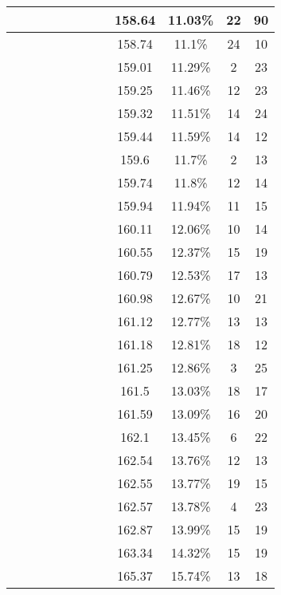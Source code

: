 \begin{center}
\begin{longtable}{|c|c|c|c|c|c|c|c|c|c|c|c|}
 \x &  \x &  &  \x &  \x &  &  &  \x & 158.64 & 11.03\% & 22 & 90 \\ \hline
 \x &  \x &  &  &  &  &  \x &  \x & 158.74 & 11.1\% & 24 & 10 \\ \hline
 \x &  \x &  &  &  \x &  \x &  \x &  & 159.01 & 11.29\% & 2 & 23 \\ \hline
 \x &  &  \x &  &  \x &  &  \x &  \x & 159.25 & 11.46\% & 12 & 23 \\ \hline
 \x &  \x &  \x &  \x &  \x &  &  \x &  & 159.32 & 11.51\% & 14 & 24 \\ \hline
 \x &  \x &  \x &  &  \x &  &  \x &  \x & 159.44 & 11.59\% & 14 & 12 \\ \hline
 \x &  &  \x &  &  &  \x &  \x &  \x & 159.6 & 11.7\% & 2 & 13 \\ \hline
 \x &  \x &  \x &  &  \x &  &  &  & 159.74 & 11.8\% & 12 & 14 \\ \hline
 \x &  &  &  \x &  &  &  \x &  \x & 159.94 & 11.94\% & 11 & 15 \\ \hline
 \x &  \x &  &  \x &  &  \x &  \x &  & 160.11 & 12.06\% & 10 & 14 \\ \hline
 \x &  \x &  \x &  \x &  \x &  &  &  & 160.55 & 12.37\% & 15 & 19 \\ \hline
 \x &  &  &  &  \x &  &  \x &  \x & 160.79 & 12.53\% & 17 & 13 \\ \hline
 \x &  &  &  &  &  &  \x &  & 160.98 & 12.67\% & 10 & 21 \\ \hline
 \x &  \x &  &  \x &  \x &  &  \x &  & 161.12 & 12.77\% & 13 & 13 \\ \hline
 \x &  &  &  &  &  &  \x &  \x & 161.18 & 12.81\% & 18 & 12 \\ \hline
 \x &  &  \x &  &  &  &  \x &  \x & 161.25 & 12.86\% & 3 & 25 \\ \hline
 \x &  &  \x &  \x &  \x &  &  &  \x & 161.5 & 13.03\% & 18 & 17 \\ \hline
 \x &  &  &  &  \x &  &  \x &  & 161.59 & 13.09\% & 16 & 20 \\ \hline
 \x &  \x &  &  \x &  &  &  \x &  \x & 162.1 & 13.45\% & 6 & 22 \\ \hline
 \x &  &  \x &  &  \x &  &  \x &  & 162.54 & 13.76\% & 12 & 13 \\ \hline
 \x &  \x &  &  \x &  \x &  &  &  & 162.55 & 13.77\% & 19 & 15 \\ \hline
 \x &  &  &  \x &  &  \x &  \x &  \x & 162.57 & 13.78\% & 4 & 23 \\ \hline
 \x &  &  &  \x &  \x &  &  &  & 162.87 & 13.99\% & 15 & 19 \\ \hline
 \x &  &  &  \x &  \x &  &  \x &  & 163.34 & 14.32\% & 15 & 19 \\ \hline
 \x &  &  \x &  \x &  \x &  \x &  &  & 165.37 & 15.74\% & 13 & 18 \\ \hline
\end{longtable}
\label{table:windProdInputParamsSeasonal}
\end{center}
\normalsize

